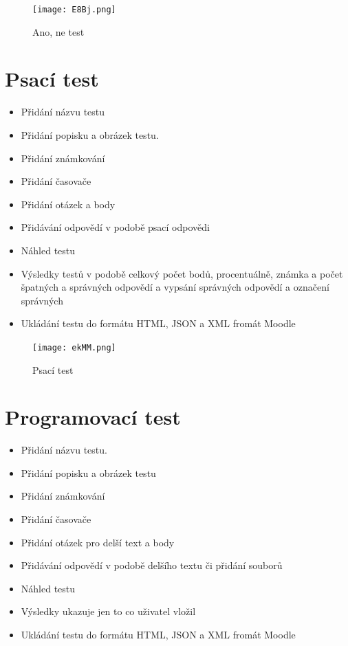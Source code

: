 \documentclass[12pt, a4paper, twoside, openright]{report}
\begin{document}
\begin{figure}[h]
		\centering
		\texttt{[image: E8Bj.png]}
		\caption{Ano, ne test}
		\label{fig:architecture}
	\end{figure}

\section{Psací test}
	\begin{itemize}
		\item Přidání názvu testu
		\item Přidání popisku a obrázek testu.
		\item Přidání známkování
		\item Přidání časovače
            \item Přidání otázek a body
            \item Přidávání odpovědí v podobě psací odpovědi
            \item Náhled testu
            \item Výsledky testů v podobě celkový počet bodů, procentuálně, známka a počet špatných a správných odpovědí a vypsání správných odpovědí a označení správných
            \item Ukládání testu do formátu HTML, JSON a XML fromát Moodle
	\end{itemize}

\begin{figure}[h]
		\centering
		\texttt{[image: ekMM.png]}
		\caption{Psací test}
		\label{fig:architecture}
	\end{figure}

\section{Programovací test}
	\begin{itemize}
		\item Přidání názvu testu.
		\item Přidání popisku a obrázek testu
		\item Přidání známkování
		\item Přidání časovače
            \item Přidání otázek pro delší text a body
            \item Přidávání odpovědí v podobě delšího textu či přidání souborů
            \item Náhled testu
            \item Výsledky ukazuje jen to co uživatel vložil
            \item Ukládání testu do formátu HTML, JSON a XML fromát Moodle
	\end{itemize}
\end{document}
